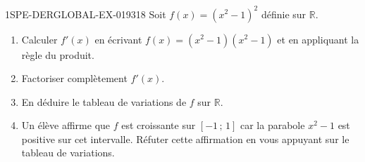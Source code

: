 \begin{exercice}{1SPE-DERGLOBAL-EX-019}{3}{18}
Soit $f(x) = (x^2-1)^2$ définie sur $\mathbb{R}$.

\begin{enumerate}
  \item Calculer $f'(x)$ en écrivant $f(x) = (x^2-1)(x^2-1)$ et en appliquant la règle du produit.
  \item Factoriser complètement $f'(x)$.
  \item En déduire le tableau de variations de $f$ sur $\mathbb{R}$.
  \item Un élève affirme que $f$ est croissante sur $[-1\,;\,1]$ car la parabole $x^2-1$ est positive sur cet intervalle. Réfuter cette affirmation en vous appuyant sur le tableau de variations.
\end{enumerate}
\end{exercice}
